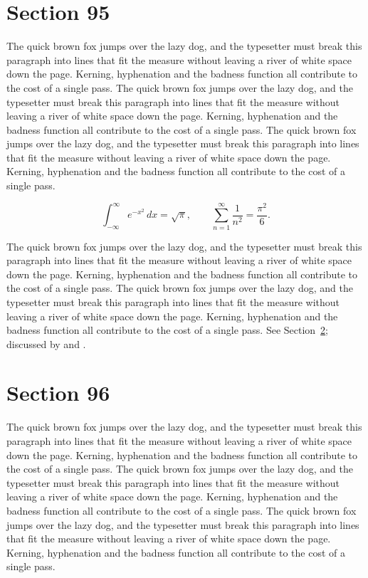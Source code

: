 \documentclass{article}
\begin{document}
\section{Section 95}
\label{sec:95}
The quick brown fox jumps over the lazy dog, and the typesetter must break this paragraph into lines that fit the measure without leaving a river of white space down the page. Kerning, hyphenation and the badness function all contribute to the cost of a single pass. The quick brown fox jumps over the lazy dog, and the typesetter must break this paragraph into lines that fit the measure without leaving a river of white space down the page. Kerning, hyphenation and the badness function all contribute to the cost of a single pass. The quick brown fox jumps over the lazy dog, and the typesetter must break this paragraph into lines that fit the measure without leaving a river of white space down the page. Kerning, hyphenation and the badness function all contribute to the cost of a single pass. 

\begin{equation}\label{eq:95}
\int_{-\infty}^{\infty} e^{-x^{2}}\,dx = \sqrt{\pi}, \qquad
\sum_{n=1}^{\infty} \frac{1}{n^{2}} = \frac{\pi^{2}}{6}.
\end{equation}

The quick brown fox jumps over the lazy dog, and the typesetter must break this paragraph into lines that fit the measure without leaving a river of white space down the page. Kerning, hyphenation and the badness function all contribute to the cost of a single pass. The quick brown fox jumps over the lazy dog, and the typesetter must break this paragraph into lines that fit the measure without leaving a river of white space down the page. Kerning, hyphenation and the badness function all contribute to the cost of a single pass. 
See Section~\ref{sec:96}; discussed by \textcite{k1} and \textcite{l3}.
\section{Section 96}
\label{sec:96}
The quick brown fox jumps over the lazy dog, and the typesetter must break this paragraph into lines that fit the measure without leaving a river of white space down the page. Kerning, hyphenation and the badness function all contribute to the cost of a single pass. The quick brown fox jumps over the lazy dog, and the typesetter must break this paragraph into lines that fit the measure without leaving a river of white space down the page. Kerning, hyphenation and the badness function all contribute to the cost of a single pass. The quick brown fox jumps over the lazy dog, and the typesetter must break this paragraph into lines that fit the measure without leaving a river of white space down the page. Kerning, hyphenation and the badness function all contribute to the cost of a single pass. 
\end{document}
